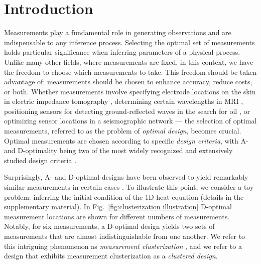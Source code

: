 \section{Introduction}\label{section:intro}
Measurements play a fundamental role in generating observations and
are indispensable to any inference process. Selecting the optimal set
of measurements holds particular significance when inferring
parameters of a physical process. Unlike many other fields, where
measurements are fixed, in this context, we have the freedom to choose
which measurements to take. This freedom should be taken advantage of:
measurements should be chosen to enhance accuracy, reduce costs, or
both. Whether measurements involve specifying electrode locations on
the skin in electric impedance tomography \cite{horesh2010impedance},
determining certain wavelengths in MRI \cite{horesh2008mri},
positioning sensors for detecting ground-reflected waves in the search
for oil \cite{horesh2008borehole}, or optimizing sensor locations in a
seismographic network \cite{rabinowitz1990, steinberg1995} --- the
selection of optimal measurements, referred to as the problem of
\emph{optimal design}, becomes crucial. Optimal measurements are
chosen according to specific \emph{design criteria}, with A- and
D-optimality being two of the most widely recognized and extensively
studied design criteria \cite{Chaloner1995,
  AlexanderianGloorGhattas14}.


Surprisingly, A- and D-optimal designs have been observed to yield
remarkably similar measurements in certain cases \cite{fedorov1996,
  nyberg2012, fedorov1997, Ucinski05, neitzel2019sparse}. To
illustrate this point, we consider a toy problem: inferring
the initial condition of the 1D heat equation (details in the
supplementary material). In Fig.~\ref{fig:clusterization
  illustration} D-optimal measurement locations are shown for
different numbers of measurements. Notably, for six measurements, a
D-optimal design yields two sets of measurements that are almost
indistinguishable from one another. We refer to this intriguing
phenomenon as \emph{measurement clusterization} \cite{Ucinski05}, and
we refer to a design that exhibits measurement clusterization as a
\emph{clustered design}.


